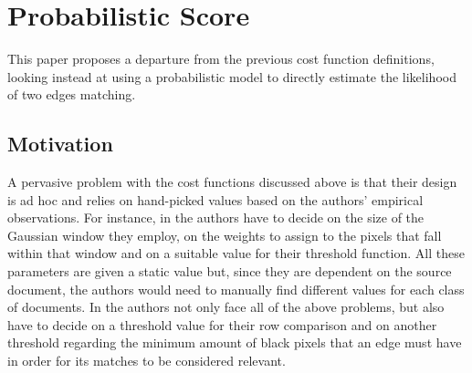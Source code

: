 \chapter{Probabilistic Score}
\label{chap4}
This paper proposes a departure from the previous cost function definitions, looking instead at using a probabilistic model to directly estimate the likelihood of two edges matching.
\section{Motivation}
A pervasive problem with the cost functions discussed above is that their design is ad hoc and relies on hand-picked values based on the authors' empirical observations. For instance, in \cite{P1} the authors have to decide on the size of the Gaussian window they employ, on the weights to assign to the pixels that fall within that window and on a suitable value for their threshold function. All these parameters are given a static value but, since they are dependent on the source document, the authors would need to manually find different values for each class of documents. In \cite{P2} the authors not only face all of the above problems, but also have to decide on a threshold value for their row comparison and on another threshold regarding the minimum amount of black pixels that an edge must have in order for its matches to be considered relevant. 

